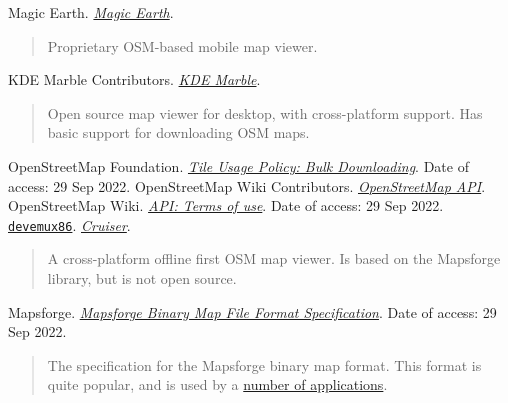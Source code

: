 \documentclass[]{final_report}
\begin{document}
\begin{thebibliography}{99}
\begin{quote}
\end{quote}
 Magic Earth. \emph{\href{https://www.magicearth.com/}{Magic Earth}}.
\begin{quote}
    Proprietary OSM-based mobile map viewer.
\end{quote}
 KDE Marble Contributors. \emph{\href{https://marble.kde.org/}{KDE Marble}}.
\begin{quote}
    Open source map viewer for desktop, with cross-platform support. Has basic support for downloading OSM maps.
\end{quote} 
 OpenStreetMap Foundation. \emph{\href{https://operations.osmfoundation.org/policies/tiles/\#bulk-downloading}{Tile Usage Policy: Bulk Downloading}}. Date of access: 29 Sep 2022.
 OpenStreetMap Wiki Contributors. \emph{\href{https://wiki.openstreetmap.org/wiki/API}{OpenStreetMap API}}.
 OpenStreetMap Wiki. \emph{\href{https://wiki.openstreetmap.org/wiki/API\#Terms_of_use}{API: Terms of use}}. Date of access: 29 Sep 2022.
 \href{https://devemux86.github.io/}{\texttt{devemux86}}. \emph{\href{https://wiki.openstreetmap.org/wiki/Cruiser}{Cruiser}}.
\begin{quote}
    A cross-platform offline first OSM map viewer. Is based on the Mapsforge library, but is not open source.
\end{quote}
 Mapsforge. \emph{\href{https://github.com/mapsforge/mapsforge/blob/master/docs/Specification-Binary-Map-File.md}{Mapsforge Binary Map File Format Specification}}. Date of access: 29 Sep 2022.
\begin{quote}
    The specification for the Mapsforge binary map format. This format is quite popular, and is used by a \href{https://github.com/mapsforge/mapsforge/blob/master/docs/Mapsforge-Applications.md}{number of applications}.
\end{quote}
\end{thebibliography}\label{endpage}
\end{document}
